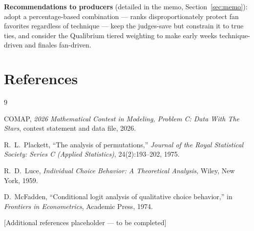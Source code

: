 \documentclass[11pt]{article}
\begin{document}
\textbf{Recommendations to producers} (detailed in the memo, Section~\ref{sec:memo}):
adopt a percentage-based combination --- ranks disproportionately protect fan
favorites regardless of technique --- keep the judges-save but constrain it to
true ties, and consider the Qualibrium tiered weighting to make early weeks
technique-driven and finales fan-driven.

\section*{References}
\begin{thebibliography}{9}

 COMAP, \emph{2026 Mathematical Contest in Modeling, Problem C:
Data With The Stars}, contest statement and data file, 2026.

 R.\ L.\ Plackett, ``The analysis of permutations,''
\emph{Journal of the Royal Statistical Society: Series C (Applied Statistics)},
24(2):193--202, 1975.

 R.\ D.\ Luce, \emph{Individual Choice Behavior: A Theoretical
Analysis}, Wiley, New York, 1959.

 D.\ McFadden, ``Conditional logit analysis of qualitative
choice behavior,'' in \emph{Frontiers in Econometrics}, Academic Press, 1974.

 [Additional references placeholder --- to be completed]

\end{thebibliography}
\end{document}
